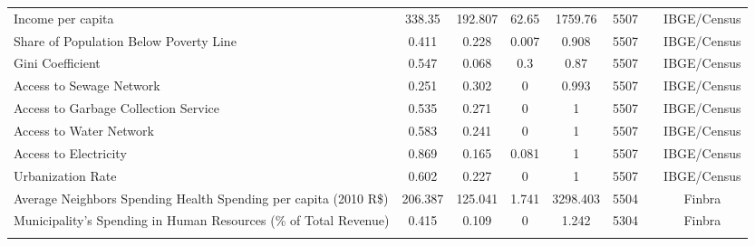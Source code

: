 \begin{table}[H]
\begin{footnotesize}
\begin{center}
{\begin{threeparttable}[b]
\begin{tabular}{rrrrrrrr}
    \multicolumn{1}{l}{Income per capita} & \multicolumn{1}{c}{338.35} & \multicolumn{1}{c}{192.807} & \multicolumn{1}{c}{62.65} & \multicolumn{1}{c}{1759.76} & \multicolumn{1}{c}{5507} &       & \multicolumn{1}{c}{IBGE/Census} \\
    \multicolumn{1}{l}{Share of Population Below Poverty Line} & \multicolumn{1}{c}{0.411} & \multicolumn{1}{c}{0.228} & \multicolumn{1}{c}{0.007} & \multicolumn{1}{c}{0.908} & \multicolumn{1}{c}{5507} &       & \multicolumn{1}{c}{IBGE/Census} \\
    \multicolumn{1}{l}{Gini Coefficient} & \multicolumn{1}{c}{0.547} & \multicolumn{1}{c}{0.068} & \multicolumn{1}{c}{0.3} & \multicolumn{1}{c}{0.87} & \multicolumn{1}{c}{5507} &       & \multicolumn{1}{c}{IBGE/Census} \\
    \multicolumn{1}{l}{Access to Sewage Network} & \multicolumn{1}{c}{0.251} & \multicolumn{1}{c}{0.302} & \multicolumn{1}{c}{0} & \multicolumn{1}{c}{0.993} & \multicolumn{1}{c}{5507} &       & \multicolumn{1}{c}{IBGE/Census} \\
    \multicolumn{1}{l}{Access to Garbage Collection Service} & \multicolumn{1}{c}{0.535} & \multicolumn{1}{c}{0.271} & \multicolumn{1}{c}{0} & \multicolumn{1}{c}{1} & \multicolumn{1}{c}{5507} &       & \multicolumn{1}{c}{IBGE/Census} \\
    \multicolumn{1}{l}{Access to Water Network} & \multicolumn{1}{c}{0.583} & \multicolumn{1}{c}{0.241} & \multicolumn{1}{c}{0} & \multicolumn{1}{c}{1} & \multicolumn{1}{c}{5507} &       & \multicolumn{1}{c}{IBGE/Census} \\
    \multicolumn{1}{l}{Access to Electricity} & \multicolumn{1}{c}{0.869} & \multicolumn{1}{c}{0.165} & \multicolumn{1}{c}{0.081} & \multicolumn{1}{c}{1} & \multicolumn{1}{c}{5507} &       & \multicolumn{1}{c}{IBGE/Census} \\
    \multicolumn{1}{l}{Urbanization Rate} & \multicolumn{1}{c}{0.602} & \multicolumn{1}{c}{0.227} & \multicolumn{1}{c}{0} & \multicolumn{1}{c}{1} & \multicolumn{1}{c}{5507} &       & \multicolumn{1}{c}{IBGE/Census} \\
    \multicolumn{1}{l}{Average Neighbors Spending Health Spending per capita (2010 R\$)} & \multicolumn{1}{c}{206.387} & \multicolumn{1}{c}{125.041} & \multicolumn{1}{c}{1.741} & \multicolumn{1}{c}{3298.403} & \multicolumn{1}{c}{5504} &       & \multicolumn{1}{c}{Finbra} \\
    \multicolumn{1}{l}{Municipality's Spending in Human Resources (\% of Total Revenue)} & \multicolumn{1}{c}{0.415} & \multicolumn{1}{c}{0.109} & \multicolumn{1}{c}{0} & \multicolumn{1}{c}{1.242} & \multicolumn{1}{c}{5304} &       & \multicolumn{1}{c}{Finbra} \\
          &       &       &       &       &       &       &  \\
    \bottomrule
    \bottomrule
    \end{tabular}%
    

\end{threeparttable}}
\end{center}
\end{footnotesize}
\end{table}
